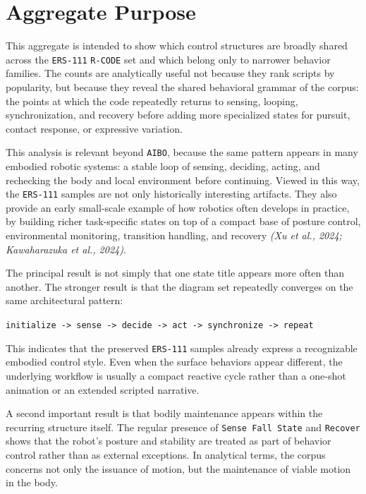 \documentclass[11pt]{article}
\begin{document}
\section*{Aggregate Purpose}

This aggregate is intended to show which control structures are broadly
shared across the \texttt{ERS-111} \texttt{R-CODE} set and which belong
only to narrower behavior families. The counts are analytically useful
not because they rank scripts by popularity, but because they reveal
the shared behavioral grammar of the corpus: the points at which the
code repeatedly returns to sensing, looping, synchronization, and
recovery before adding more specialized states for pursuit, contact
response, or expressive variation.

This analysis is relevant beyond \texttt{AIBO}, because the same
pattern appears in many embodied robotic systems: a stable loop of
sensing, deciding, acting, and rechecking the body and local
environment before continuing. Viewed in this way, the
\texttt{ERS-111} samples are not only historically interesting
artifacts. They also provide an early small-scale example of how
robotics often develops in practice, by building richer task-specific
states on top of a compact base of posture control, environmental
monitoring, transition handling, and recovery \textit{(Xu et al., 2024; Kawaharazuka et al., 2024)}.

The principal result is not simply that one state title appears more
often than another. The stronger result is that the diagram set
repeatedly converges on the same architectural pattern:

\begin{center}
\texttt{initialize -> sense -> decide -> act -> synchronize -> repeat}
\end{center}

This indicates that the preserved \texttt{ERS-111} samples already
express a recognizable embodied control style. Even when the surface
behaviors appear different, the underlying workflow is usually a
compact reactive cycle rather than a one-shot animation or an extended
scripted narrative.

A second important result is that bodily maintenance appears within the
recurring structure itself. The regular presence of \texttt{Sense Fall
State} and \texttt{Recover} shows that the robot's posture and
stability are treated as part of behavior control rather than as
external exceptions. In analytical terms, the corpus concerns not only
the issuance of motion, but the maintenance of viable motion in the
body.
\end{document}

